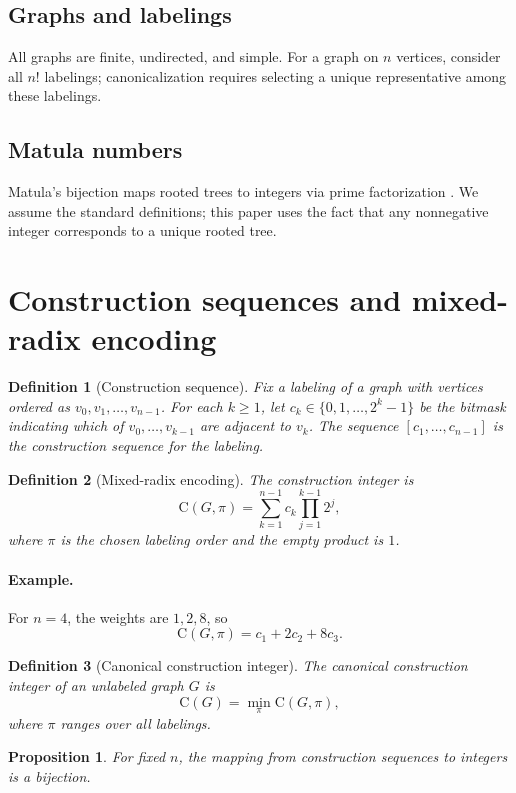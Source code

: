 \documentclass[11pt]{article}
\newtheorem{definition}{Definition}
\newtheorem{proposition}{Proposition}
\begin{document}
\subsection{Graphs and labelings}
All graphs are finite, undirected, and simple. For a graph on $n$ vertices,
consider all $n!$ labelings; canonicalization requires selecting a unique
representative among these labelings.

\subsection{Matula numbers}
Matula's bijection maps rooted trees to integers via prime factorization
\cite{matula1968,goebel1980}. We assume the standard definitions; this paper
uses the fact that any nonnegative integer corresponds to a unique rooted tree.

\section{Construction sequences and mixed-radix encoding}
\begin{definition}[Construction sequence]
Fix a labeling of a graph with vertices ordered as $v_0, v_1, \dots, v_{n-1}$.
For each $k \ge 1$, let $c_k \in \{0,1,\dots,2^k-1\}$ be the bitmask indicating
which of $v_0,\dots,v_{k-1}$ are adjacent to $v_k$. The sequence
$[c_1,\dots,c_{n-1}]$ is the \emph{construction sequence} for the labeling.
\end{definition}

\begin{definition}[Mixed-radix encoding]
The construction integer is
\[
    \mathrm{C}(G,\pi) = \sum_{k=1}^{n-1} c_k \prod_{j=1}^{k-1} 2^j,
\]
where $\pi$ is the chosen labeling order and the empty product is $1$.
\end{definition}

\paragraph{Example.}
For $n=4$, the weights are $1,2,8$, so
\[
\mathrm{C}(G,\pi)=c_1+2c_2+8c_3.
\]

\begin{definition}[Canonical construction integer]
The canonical construction integer of an unlabeled graph $G$ is
\[\mathrm{C}(G) = \min_{\pi} \mathrm{C}(G,\pi),\]
where $\pi$ ranges over all labelings.
\end{definition}

\begin{proposition}
For fixed $n$, the mapping from construction sequences to integers is a bijection.
\end{proposition}
\end{document}
